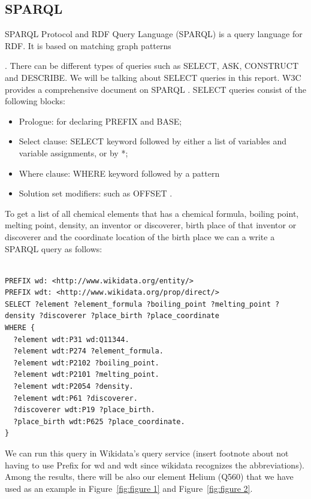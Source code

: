 \documentclass[12 pt, a4paper]{report}
\theoremstyle{definition}
\begin{document}
\subsection{SPARQL}
SPARQL Protocol and RDF Query Language (SPARQL) is a query language for RDF. It is based on matching graph patterns {\cite{ E.Prudhommeaux2005}. There can be different types of queries such as SELECT, ASK, CONSTRUCT and DESCRIBE. We will be talking about SELECT queries in this report. W3C provides a comprehensive document on SPARQL \cite{C.B.Aranda2013}. SELECT queries consist of the following blocks:

\begin{itemize}
\item Prologue: for declaring PREFIX and BASE;
\item Select clause: SELECT keyword followed by either a list of variables and variable assignments, or by *;
\item Where clause: WHERE keyword followed by a pattern
\item Solution set modifiers: such as OFFSET \cite{Kroetzsch2020}.
\end{itemize}

To get a list of all chemical elements that has a chemical formula, boiling point, melting point, density, an inventor or discoverer, birth place of that inventor or discoverer and the coordinate location of the birth place we can a write a SPARQL query as follows:

\begin{minipage}{\linewidth}
\begin{lstlisting}

PREFIX wd: <http://www.wikidata.org/entity/>
PREFIX wdt: <http://www.wikidata.org/prop/direct/>
SELECT ?element ?element_formula ?boiling_point ?melting_point ?density ?discoverer ?place_birth ?place_coordinate
WHERE {
  ?element wdt:P31 wd:Q11344.
  ?element wdt:P274 ?element_formula. 
  ?element wdt:P2102 ?boiling_point.
  ?element wdt:P2101 ?melting_point.
  ?element wdt:P2054 ?density.
  ?element wdt:P61 ?discoverer.
  ?discoverer wdt:P19 ?place_birth.
  ?place_birth wdt:P625 ?place_coordinate.
}

\end{lstlisting}
\end{minipage}

We can run this query in Wikidata’s query service (insert footnote about not having to use Prefix for wd and wdt since wikidata recognizes the abbreviations). Among the results, there will be also our element Helium (Q560) that we have used as an example in Figure~\ref{fig:figure 1} and Figure~\ref{fig:figure 2}.

}
\end{document}
